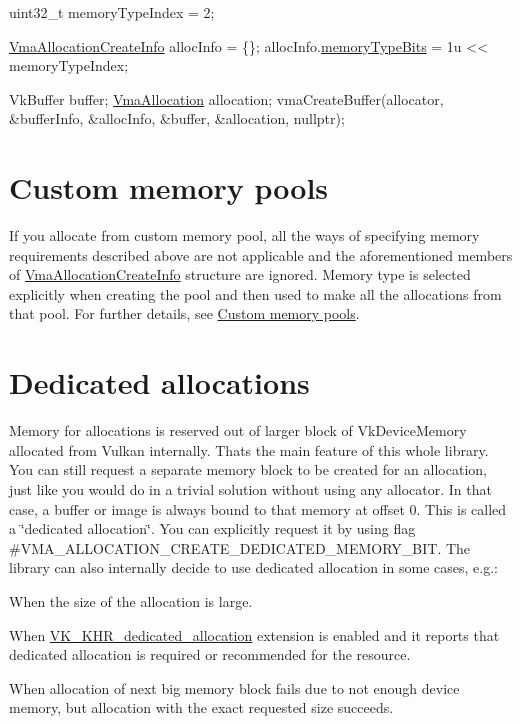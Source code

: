 \begin{DoxyCode}
uint32\_t memoryTypeIndex = 2;

\hyperlink{structVmaAllocationCreateInfo}{VmaAllocationCreateInfo} allocInfo = \{\};
allocInfo.\hyperlink{structVmaAllocationCreateInfo_a3bf940c0271d85d6ba32a4d820075055}{memoryTypeBits} = 1u << memoryTypeIndex;

VkBuffer buffer;
\hyperlink{structVmaAllocation}{VmaAllocation} allocation;
vmaCreateBuffer(allocator, &bufferInfo, &allocInfo, &buffer, &allocation, \textcolor{keyword}{nullptr});
\end{DoxyCode}
\hypertarget{choosing_memory_type_choosing_memory_type_custom_memory_pools}{}\section{Custom memory pools}\label{choosing_memory_type_choosing_memory_type_custom_memory_pools}
If you allocate from custom memory pool, all the ways of specifying memory requirements described above are not applicable and the aforementioned members of \hyperlink{structVmaAllocationCreateInfo}{Vma\+Allocation\+Create\+Info} structure are ignored. Memory type is selected explicitly when creating the pool and then used to make all the allocations from that pool. For further details, see \hyperlink{custom_memory_pools}{Custom memory pools}.\hypertarget{choosing_memory_type_choosing_memory_type_dedicated_allocations}{}\section{Dedicated allocations}\label{choosing_memory_type_choosing_memory_type_dedicated_allocations}
Memory for allocations is reserved out of larger block of {\ttfamily Vk\+Device\+Memory} allocated from Vulkan internally. That\textquotesingle{}s the main feature of this whole library. You can still request a separate memory block to be created for an allocation, just like you would do in a trivial solution without using any allocator. In that case, a buffer or image is always bound to that memory at offset 0. This is called a \char`\"{}dedicated allocation\char`\"{}. You can explicitly request it by using flag \#\+V\+M\+A\+\_\+\+A\+L\+L\+O\+C\+A\+T\+I\+O\+N\+\_\+\+C\+R\+E\+A\+T\+E\+\_\+\+D\+E\+D\+I\+C\+A\+T\+E\+D\+\_\+\+M\+E\+M\+O\+R\+Y\+\_\+\+B\+IT. The library can also internally decide to use dedicated allocation in some cases, e.\+g.\+:


\begin{DoxyItemize}
\item When the size of the allocation is large.
\item When \hyperlink{vk_khr_dedicated_allocation}{V\+K\+\_\+\+K\+H\+R\+\_\+dedicated\+\_\+allocation} extension is enabled and it reports that dedicated allocation is required or recommended for the resource.
\item When allocation of next big memory block fails due to not enough device memory, but allocation with the exact requested size succeeds. 
\end{DoxyItemize}